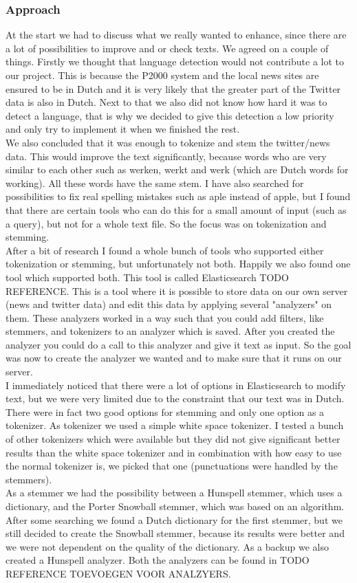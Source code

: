 \subsubsection*{Approach}
At the start we had to discuss what we really wanted to enhance, since there are a lot of possibilities to improve and or check texts. We agreed on a couple of things. Firstly we thought that language detection would not contribute a lot to our project. This is because the P2000 system and the local news sites are ensured to be in Dutch and it is very likely that the greater part of the Twitter data is also in Dutch. Next to that we also did not know how hard it was to detect a language, that is why we decided to give this detection a low priority and only try to implement it when we finished the rest. \\
We also concluded that it was enough to tokenize and stem the twitter/news data. This would improve the text significantly, because words who are very similar to each other such as werken, werkt and werk (which are Dutch words for working). All these words have the same stem. I have also searched for possibilities to fix real spelling mistakes such as aple instead of apple, but I found that there are certain tools who can do this for a small amount of input (such as a query), but not for a whole text file. So the focus was on tokenization and stemming.\\
After a bit of research I found a whole bunch of tools who supported either tokenization or stemming, but unfortunately not both. Happily we also found one tool which supported both. This tool is called Elasticsearch TODO REFERENCE. This is a tool where it is possible to store data on our own server (news and twitter data) and edit this data by applying several "analyzers" on them. These analyzers worked in a way such that you could add filters, like stemmers, and tokenizers to an analyzer which is saved. After you created the analyzer you could do a call to this analyzer and give it text as input. So the goal was now to create the analyzer we wanted and to make sure that it runs on our server. \\
I immediately noticed that there were a lot of options in Elasticsearch to modify text, but we were very limited due to the constraint that our text was in Dutch. There were in fact two good options for stemming and only one option as a tokenizer. As tokenizer we used a simple white space tokenizer. I tested a bunch of other tokenizers which were available but they did not give significant better results than the white space tokenizer and in combination with how easy to use the normal tokenizer is, we picked that one (punctuations were handled by the stemmers). \\
As a stemmer we had the possibility between a Hunspell stemmer, which uses a dictionary, and the Porter Snowball stemmer, which was based on an algorithm. After some searching we found a Dutch dictionary for the first stemmer, but we still decided to create the Snowball stemmer, because its results were better and we were not dependent on the quality of the dictionary. As a backup we also created a Hunspell analyzer. Both the analyzers can be found in TODO REFERENCE TOEVOEGEN VOOR ANALZYERS.

